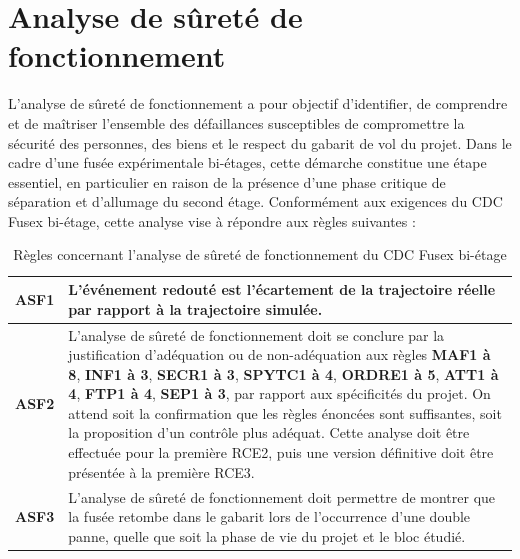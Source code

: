 \section{Analyse de sûreté de fonctionnement}
\label{sec:analyse_surete_fonc}

L’analyse de sûreté de fonctionnement a pour objectif d’identifier, de comprendre et de maîtriser l’ensemble des défaillances
susceptibles de compromettre la sécurité des personnes, des biens et le respect du gabarit de vol du projet. Dans le cadre d’une
fusée expérimentale bi-étages, cette démarche constitue une étape essentiel, en particulier en raison de la présence d’une
phase critique de séparation et d’allumage du second étage. Conformément aux exigences du \acrshort{CDC} \gls{Fusex} bi-étage,
cette analyse vise à répondre aux règles suivantes :

\begin{table}[h!]
    \centering
    \begin{tabular}{|l|p{13cm}|}
        \hline
        \textbf{ASF1} & L’événement redouté est l’écartement de la trajectoire réelle par rapport à la trajectoire simulée. \\
        \hline
        \textbf{ASF2} & L’analyse de sûreté de fonctionnement doit se conclure par la justification d’adéquation ou de
        non-adéquation aux règles \textbf{MAF1 à 8}, \textbf{INF1 à 3}, \textbf{SECR1 à 3}, \textbf{SPYTC1 à 4},
        \textbf{ORDRE1 à 5}, \textbf{ATT1 à 4}, \textbf{FTP1 à 4}, \textbf{SEP1 à 3}, par rapport aux spécificités du projet. On
        attend soit la confirmation que les règles énoncées sont suffisantes, soit la proposition d’un contrôle plus adéquat.
        Cette analyse doit être effectuée pour la première RCE2, puis une version définitive doit être présentée à la première
        RCE3. \\
        \hline
        \textbf{ASF3} & L’analyse de sûreté de fonctionnement doit permettre de montrer que la fusée retombe dans le gabarit
        lors de l’occurrence d’une double panne, quelle que soit la phase de vie du projet et le bloc étudié. \\
        \hline
    \end{tabular}
    \caption{Règles concernant l'analyse de sûreté de fonctionnement du \acrshort{CDC} \gls{Fusex} bi-étage
    \cite[p. ~21]{CDC_BiEtage}}
    \label{tab:regles_surete_fonc}
\end{table}

